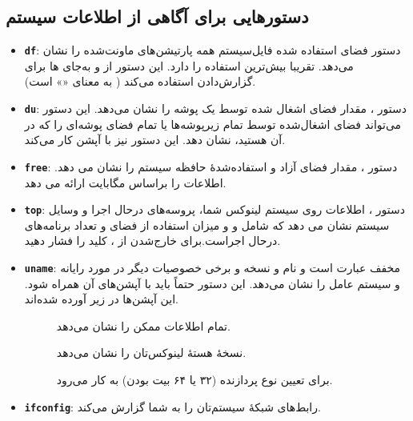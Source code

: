 \subsection{دستورهایی برای آگاهی از اطلاعات سیستم}
\begin{itemize}
\item \textbf{\texttt{\Large df}}: دستور  فضای استفاده شده فایل‌سیستم همه پارتیشن‌های ماونت‌شده را نشان می‌دهد.  تقریبا بیش‌ترین استفاده را دارد. این دستور از  و  به‌جای ها برای گزارش‌دادن استفاده می‌کند ( به معنای «» است).

\item \textbf{\texttt{\Large du}}: دستور ، مقدار فضای اشغال شده توسط یک پوشه را نشان می‌دهد. این دستور می‌تواند فضای اشغال‌شده توسط تمام زیرپوشه‌ها یا تمام فضای پوشه‌ای را که در آن هستید، نشان دهد. این دستور نیز با آپشن  کار می‌کند.

\item \textbf{\texttt{\Large free}}: دستور ، مقدار فضای آزاد و استفاده‌شدهٔ حافظه سیستم را نشان می دهد.  اطلاعات را براساس مگابایت ارائه می دهد.

\item \textbf{\texttt{\Large top}}: دستور ، اطلاعات روی سیستم لینوکس شما، پروسه‌های درحال اجرا و وسایل سیستم نشان می دهد که شامل  و  و میزان استفاده از فضای  و تعداد برنامه‌های درحال اجراست.برای خارج‌شدن از ، کلید  را فشار دهید.

\item \textbf{\texttt{\Large uname}}: مخفف عبارت  است و نام و نسخه و برخی خصوصیات دیگر در مورد رایانه و سیستم عامل را نشان می‌دهد. این دستور حتماً باید با آپشن‌های آن همراه شود. این آپشن‌ها در زیر آورده شده‌اند.
\begin{description}
\item[] تمام اطلاعات ممکن را نشان می‌دهد.

\item[] نسخهٔ هستهٔ لینوکس‌تان را نشان می‌دهد.

\item[] برای تعیین نوع پردازنده (۳۲ یا ۶۴ بیت بودن) به کار می‌رود.
\end{description}

\item \textbf{\texttt{\Large ifconfig}}: رابط‌های شبکهٔ سیستم‌تان را به شما گزارش می‌کند.


\end{itemize}
